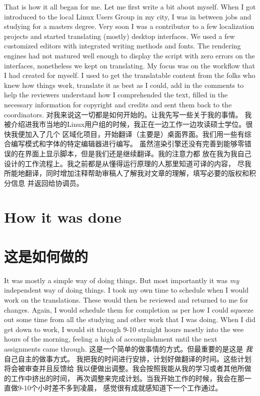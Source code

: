 That is how it all began for me. Let me first write a bit about myself. When I
got introduced to the local Linux Users Group in my city, I was in between jobs
and studying for a masters degree. Very soon I was a contributor to a few
localization projects and started translating (mostly) desktop interfaces. We
used a few customized editors with integrated writing methods and fonts. The
rendering engines had not matured well enough to display the script with zero
errors on the interfaces, nonetheless we kept on translating. My focus was on
the workflow that I had created for myself. I used to get the translatable
content from the folks who knew how things work, translate it as best as I
could, add in the comments to help the reviewers understand how I comprehended
the text, filled in the necessary information for copyright and credits and sent
them back to the coordinators.
对我来说这一切都是如何开始的。让我先写一些关于我的事情。
我被介绍进我市当地的Linux用户组的时候，我正在一边工作一边攻读硕士学位。很快我便加入了几个
区域化项目，开始翻译（主要是）桌面界面。我们用一些有综合编写模式和字体的特定编辑器进行编写。
虽然渲染引擎还没有完善到能够零错误的在界面上显示脚本，但是我们还是继续翻译。我的注意力都
放在我为我自己设计的工作流程上。我之前都是从懂得运行原理的人那里知道可译的内容，
尽我所能地翻译，同时增加注释帮助审稿人了解我对文章的理解，填写必要的版权和积分信息
并返回给协调员。

\section*{How it was done}
\section*{这是如何做的}

It was mostly a simple way of doing things. But most importantly it was
\textit{my} independent way of doing things. I took my own time to schedule when
I would work on the translations. These would then be reviewed and returned to
me for changes. Again, I would schedule them for completion as per how I could
squeeze out some time from all the studying and other work that I was doing.
When I did get down to work, I would sit through 9-10 straight hours mostly into
the wee hours of the morning, feeling a high of accomplishment until the next
assignments came through.
这是一个简单的做事情的方式。但最重要的是这是
\textit{我}自己自主的做事方式。
我把我的时间进行安排，计划好做翻译的时间。这些计划将会被审查并且反馈给
我以便做出调整。我会按照我能从我的学习或者其他所做的工作中挤出的时间，
再次调整来完成计划。当我开始工作的时候，我会在那一直做9-10个小时差不多到凌晨，
感觉很有成就感知道下一个工作通过。
